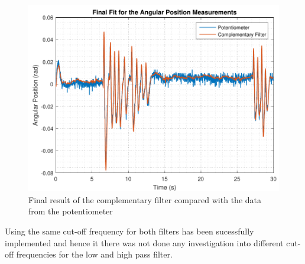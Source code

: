 %
\begin{figure}[H]
	\centering
	\includegraphics[scale=0.65]{figures/filterSensTool}
	\caption{Final result of the complementary filter compared with the data from the potentiometer}
	\label{filterSensTool}
\end{figure}\vspace{-5mm}
%
Using the same cut-off frequency for both filters has been sucessfully implemented and hence it there was not done any investigation into different cut-off frequencies for the low and high pass filter.\\
